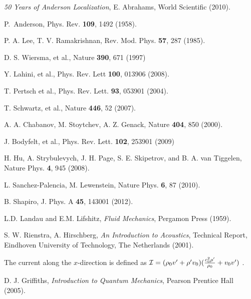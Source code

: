 \documentclass[aps,prl,twocolumn,groupedaddress,amsmath,amssymb]{revtex4}
\begin{document}
\begin{thebibliography}{99}

 {\it 50 Years of Anderson Localization}, E. Abrahams, World Scientific (2010).

 P.~Anderson, Phys. Rev. {\bf 109}, 1492 (1958).

 P. A. Lee, T. V. Ramakrishnan, Rev. Mod. Phys. {\bf 57}, 287 (1985).

 D. S. Wiersma, et al., Nature {\bf 390}, 671 (1997)

 Y. Lahini, et al., Phys. Rev. Lett {\bf 100}, 013906 (2008).

 T. Pertsch et al., Phys. Rev. Lett. {\bf 93}, 053901 (2004).

 T. Schwartz, et al., Nature {\bf 446}, 52 (2007).

 A. A. Chabanov, M. Stoytchev, A. Z. Genack, Nature {\bf 404}, 850 (2000).

J. Bodyfelt, et al., Phys. Rev. Lett. {\bf 102}, 253901 (2009)

H. Hu, A. Strybulevych, J. H. Page, S. E. Skipetrov, and B. A. van Tiggelen, Nature Phys. {\bf 4}, 945 (2008).

L. Sanchez-Palencia, M. Lewenstein, Nature Phys. {\bf 6}, 87 (2010).

 B. Shapiro, J. Phys. A {\bf 45}, 143001 (2012).

 L.D. Landau and E.M. Lifshitz, {\it Fluid Mechanics}, Pergamon Press (1959).

 S. W. Rienstra, A. Hirschberg, {\it An Introduction to Acoustics}, Technical Report, Eindhoven University of Technology,
The Netherlands (2001).

 The current along the $x$-direction is defined as ${\cal I}=(\rho_0 v' +\rho' v_0)({c_0^2 \rho'\over \rho_0} + v_0 v')$ \cite{RH14}.

 D. J. Griffiths, {\it Introduction to Quantum Mechanics},  Pearson Prentice Hall (2005).

\end{thebibliography}
\end{document}

